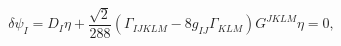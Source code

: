 \begin{equation}
\label{Killing}
\delta \psi_{I} = D_{I} \eta + \frac{ \sqrt{2} }{288}
   (\Gamma_{IJKLM} - 8 g_{IJ} \Gamma_{KLM}) G^{JKLM} \eta = 0,
\end{equation}

